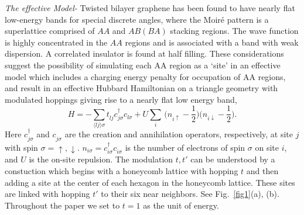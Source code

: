 \documentclass[%
 reprint,
 amsmath,amssymb,
 aps,
]{revtex4-1}
\begin{document}
\textit{The effective Model-}
Twisted bilayer graphene has been found to have nearly flat low-energy
bands for special discrete angles, where the Moir\'e pattern is a
superlattice comprised of $AA$ and $AB(BA)$ stacking
regions\cite{magic1,magic2,baskaran18,lado18,jiang17}. The wave function is highly concentrated in
the $AA$ regions and is associated with
a band with weak dispersion.  A correlated insulator
is found at half filling\cite{cao18a}.
These considerations suggest the possibility of simulating
each AA region as a `site' in an effective model which includes
a charging energy penalty for occupation of AA regions,
and result in an effective Hubbard Hamiltonian
on a triangle geometry
with modulated hoppings giving rise to a nearly flat low energy band,
\begin{equation}\label{eq1}
H=-\sum_{\langle lj \rangle \sigma}t^{\phantom{\dag}}_{lj}
c^\dag_{j\sigma}c^{\phantom{\dag}}_{l\sigma}+
U\sum_{i}\, \big(n^{\phantom{\dag}}_{i\uparrow}-\frac{1}{2}\big)
\big(n^{\phantom{\dag}}_{i\downarrow}-\frac{1}{2}\big).
\end{equation}
Here $c^\dag_{j\sigma}$ and
$c^{\phantom{\dag}}_{j\sigma}$
are the creation and annihilation operators, respectively, at site $j$
with spin $\sigma=\uparrow, \downarrow$.
$n_{i\sigma}=c^{\dagger}_{i\sigma}c^{\phantom{\dag}}_{i\sigma}$
is the number of
electrons of spin $\sigma$ on site $i$, and $U$ is the on-site repulsion.
The modulation $t,t'$ can be understood by a constuction which begins
with a honeycomb lattice with hopping $t$ and then adding a site at the
center of each hexagon in the honeycomb lattice.  These sites are linked
with hopping $t'$ to their six near neighbors.
See Fig.~\ref{fig1}(a), (b).
Throughout the paper we set to $t=1$ as the unit of energy.
\end{document}
